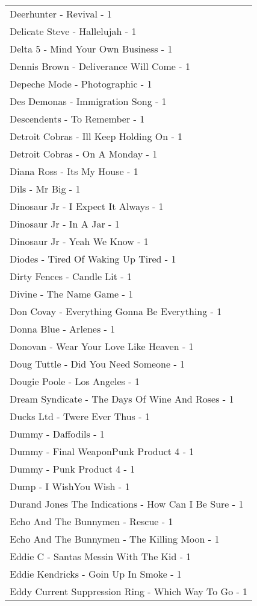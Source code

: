 \documentclass[
]{article}
\begin{document}
\begin{longtable}{l}
Deerhunter - Revival - 1 \\ 
Delicate Steve - Hallelujah - 1 \\ 
Delta 5 - Mind Your Own Business - 1 \\ 
Dennis Brown - Deliverance Will Come - 1 \\ 
Depeche Mode - Photographic - 1 \\ 
Des Demonas - Immigration Song - 1 \\ 
Descendents - To Remember - 1 \\ 
Detroit Cobras - Ill Keep Holding On - 1 \\ 
Detroit Cobras - On A Monday - 1 \\ 
Diana Ross - Its My House - 1 \\ 
Dils - Mr Big - 1 \\ 
Dinosaur Jr - I Expect It Always - 1 \\ 
Dinosaur Jr - In A Jar - 1 \\ 
Dinosaur Jr - Yeah We Know - 1 \\ 
Diodes - Tired Of Waking Up Tired - 1 \\ 
Dirty Fences - Candle Lit - 1 \\ 
Divine - The Name Game - 1 \\ 
Don Covay - Everything Gonna Be Everything - 1 \\ 
Donna Blue - Arlenes - 1 \\ 
Donovan - Wear Your Love Like Heaven - 1 \\ 
Doug Tuttle - Did You Need Someone - 1 \\ 
Dougie Poole - Los Angeles - 1 \\ 
Dream Syndicate - The Days Of Wine And Roses - 1 \\ 
Ducks Ltd - Twere Ever Thus - 1 \\ 
Dummy - Daffodils - 1 \\ 
Dummy - Final WeaponPunk Product 4 - 1 \\ 
Dummy - Punk Product 4 - 1 \\ 
Dump - I WishYou Wish - 1 \\ 
Durand Jones The Indications - How Can I Be Sure - 1 \\ 
Echo And The Bunnymen - Rescue - 1 \\ 
Echo And The Bunnymen - The Killing Moon - 1 \\ 
Eddie C - Santas Messin With The Kid - 1 \\ 
Eddie Kendricks - Goin Up In Smoke - 1 \\ 
Eddy Current Suppression Ring - Which Way To Go - 1 \\ 

\end{longtable}
\end{document}
